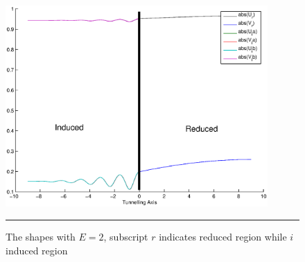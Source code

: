  \begin{figure}[htbp]
\small
	\centering
		\includegraphics[width=10cm]{./Figures/3-2-4.eps}
		\rule{35em}{0.5pt}
	\caption[An Electron]{The shapes with $E=2$, subscript $r$ indicates reduced region while $i$ induced region}
	\label{fig:Electron}
\end{figure}


